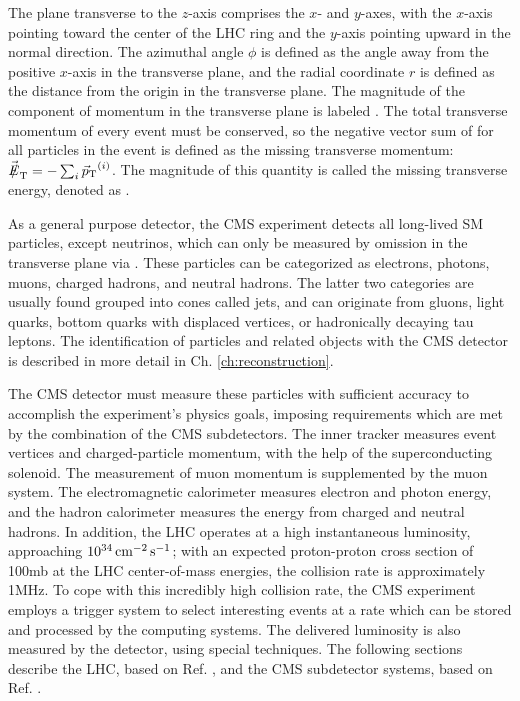 The plane transverse to the $z$-axis comprises the $x$- and $y$-axes, with the $x$-axis pointing toward the center of the LHC ring and the $y$-axis pointing upward in the normal direction. The azimuthal angle $\phi$ is defined as the angle away from the positive $x$-axis in the transverse plane, and the radial coordinate $r$ is defined as the distance from the origin in the transverse plane. The magnitude of the component of momentum in the transverse plane is labeled \pt. The total transverse momentum of every event must be conserved, so the negative vector sum of \vecpt for all particles in the event is defined as the missing transverse momentum: $\vecmet = - \sum_{i} \vecpt^{(i)}$. The magnitude of this quantity is called the missing transverse energy, denoted as \met.

As a general purpose detector, the CMS experiment detects all long-lived SM particles, except neutrinos, which can only be measured by omission in the transverse plane via \met. These particles can be categorized as electrons, photons, muons, charged hadrons, and neutral hadrons. The latter two categories are usually found grouped into cones called jets, and can originate from gluons, light quarks, bottom quarks with displaced vertices, or hadronically decaying tau leptons. The identification of particles and related objects with the CMS detector is described in more detail in Ch. \ref{ch:reconstruction}.

The CMS detector must measure these particles with sufficient accuracy to accomplish the experiment's physics goals, imposing requirements which are met by the combination of the CMS subdetectors. The inner tracker measures event vertices and charged-particle momentum, with the help of the superconducting solenoid. The measurement of muon momentum is supplemented by the muon system. The electromagnetic calorimeter measures electron and photon energy, and the hadron calorimeter measures the energy from charged and neutral hadrons. In addition, the LHC operates at a high instantaneous luminosity, approaching $10^{34}\,\text{cm}^\text{$-$2}\,\text{s}^\text{$-$1}$; with an expected proton-proton cross section of 100\unit{mb} at the LHC center-of-mass energies, the collision rate is approximately 1\unit{MHz}. To cope with this incredibly high collision rate, the CMS experiment employs a trigger system to select interesting events at a rate which can be stored and processed by the computing systems. The delivered luminosity is also measured by the detector, using special techniques. The following sections describe the LHC, based on Ref. \cite{LHCmachine}, and the CMS subdetector systems, based on Ref. \cite{CMSJINST}.

